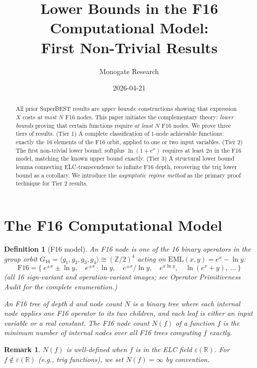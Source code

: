 \documentclass[11pt]{article}
\title{Lower Bounds in the F16 Computational Model:\\
First Non-Trivial Results}
\author{Monogate Research}
\date{2026-04-21}
\newtheorem{definition}[theorem]{Definition}
\newtheorem{remark}[theorem]{Remark}
\begin{document}
\maketitle

\begin{abstract}
All prior SuperBEST results are \emph{upper bounds}: constructions showing that
expression $X$ costs \emph{at most} $N$ F16 nodes.
This paper initiates the complementary theory: \emph{lower bounds} proving
that certain functions require \emph{at least} $N$ F16 nodes.
We prove three tiers of results.
(Tier 1) A complete classification of 1-node achievable functions:
exactly the 16 elements of the F16 orbit, applied to one or two input variables.
(Tier 2) The first non-trivial lower bound: softplus $\ln(1{+}e^x)$ requires
at least $2n$ in the F16 model, matching the known upper bound exactly.
(Tier 3) A structural lower bound lemma connecting ELC-transcendence to
infinite F16 depth, recovering the trig lower bound as a corollary.
We introduce the \emph{asymptotic regime method} as the primary proof technique
for Tier 2 results.
\end{abstract}

\section{The F16 Computational Model}

\begin{definition}[F16 model]
An \emph{F16 node} is one of the 16 binary operators in the group orbit
$G_{16} = \langle g_1, g_2, g_3, g_4 \rangle \cong (\mathbb{Z}/2)^4$
acting on $\mathrm{EML}(x,y) = e^x - \ln y$:
\[
\mathrm{F16} = \{\ e^{\pm x} \pm \ln y,\quad e^{\pm x} \cdot \ln y,\quad
  e^{\pm x} / \ln y,\quad e^{x \ln y},\quad \ln(e^x + y),\ \ldots \ \}
\]
(all 16 sign-variant and operation-variant images; see Operator Primitiveness Audit
for the complete enumeration.)

An \emph{F16 tree} of depth $d$ and node count $N$ is a binary tree where
each internal node applies one F16 operator to its two children,
and each leaf is either an input variable or a real constant.
The \emph{F16 node count} $N(f)$ of a function $f$ is the minimum number
of internal nodes over all F16 trees computing $f$ exactly.
\end{definition}

\begin{remark}
$N(f)$ is well-defined when $f$ is in the ELC field $\varepsilon(\mathbb{R})$.
For $f \notin \varepsilon(\mathbb{R})$ (e.g., trig functions), we set
$N(f) = \infty$ by convention.
\end{remark}
\end{document}
